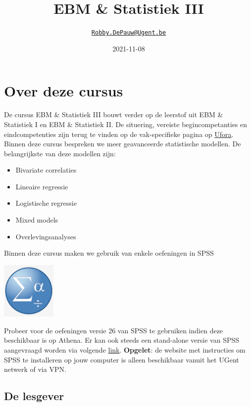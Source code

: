 \documentclass[
]{book}
\title{EBM \& Statistiek III}
\author{\href{mailto:Robby.DePauw@Ugent.be}{\nolinkurl{Robby.DePauw@Ugent.be}}}
\date{2021-11-08}
\providecommand{\tightlist}{%
  \setlength{\itemsep}{0pt}\setlength{\parskip}{0pt}}
\theoremstyle{definition}
\theoremstyle{definition}
\theoremstyle{definition}
\theoremstyle{definition}
\theoremstyle{remark}
\begin{document}
\maketitle

{
\setcounter{tocdepth}{2}
\tableofcontents
}
\hypertarget{over-deze-cursus}{%
\chapter*{Over deze cursus}\label{over-deze-cursus}}


De cursus {EBM \& Statistiek III} bouwt verder op de leerstof uit {EBM \& Statistiek I} en {EBM \& Statistiek II}. De situering, vereiste begincompetanties en eindcompetenties zijn terug te vinden op de vak-specifieke pagina op \href{https://ufora.ugent.be}{Ufora}. Binnen deze cursus bespreken we meer geavanceerde statistische modellen. De belangrijkste van deze modellen zijn:

\begin{itemize}
\tightlist
\item
  Bivariate correlaties
\item
  Lineaire regressie
\item
  Logistische regressie
\item
  Mixed models
\item
  Overlevingsanalyses
\end{itemize}

Binnen deze cursus maken we gebruik van enkele oefeningen in {SPSS}

\includegraphics[width=1.04167in,height=\textheight]{img/spss.png}

Probeer voor de oefeningen versie 26 van {SPSS} te gebruiken indien deze beschikbaar is op Athena. Er kan ook steeds een stand-alone versie van {SPSS} aangevraagd worden via volgende \href{https://helpdesk.ugent.be/athena/}{link}. \textbf{Opgelet}: de website met instructies om {SPSS} te installeren op jouw computer is alleen beschikbaar vanuit het UGent netwerk of via VPN.

\hypertarget{de-lesgever}{%
\section*{De lesgever}\label{de-lesgever}}
\end{document}
